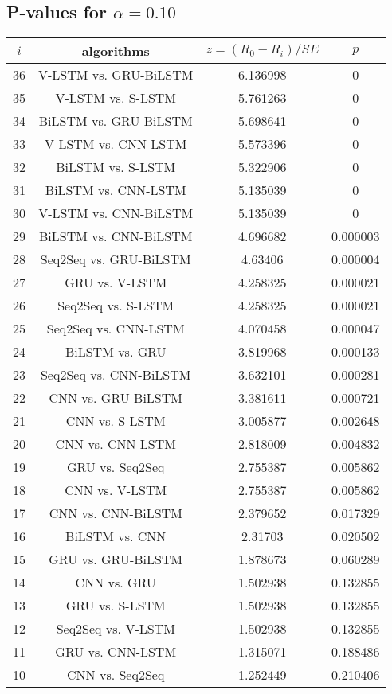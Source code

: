 \documentclass[a4paper,10pt]{article}
\begin{document}
\begin{landscape}
\subsection{P-values for $\alpha=0.10$}

\begin{table}[!htp]
\centering\scriptsize
\begin{tabular}{cccc}
$i$&algorithms&$z=(R_0 - R_i)/SE$&$p$\\
\hline36&V-LSTM vs. GRU-BiLSTM&6.136998&0\\
35&V-LSTM vs. S-LSTM&5.761263&0\\
34&BiLSTM vs. GRU-BiLSTM&5.698641&0\\
33&V-LSTM vs. CNN-LSTM&5.573396&0\\
32&BiLSTM vs. S-LSTM&5.322906&0\\
31&BiLSTM vs. CNN-LSTM&5.135039&0\\
30&V-LSTM vs. CNN-BiLSTM&5.135039&0\\
29&BiLSTM vs. CNN-BiLSTM&4.696682&0.000003\\
28&Seq2Seq vs. GRU-BiLSTM&4.63406&0.000004\\
27&GRU vs. V-LSTM&4.258325&0.000021\\
26&Seq2Seq vs. S-LSTM&4.258325&0.000021\\
25&Seq2Seq vs. CNN-LSTM&4.070458&0.000047\\
24&BiLSTM vs. GRU&3.819968&0.000133\\
23&Seq2Seq vs. CNN-BiLSTM&3.632101&0.000281\\
22&CNN vs. GRU-BiLSTM&3.381611&0.000721\\
21&CNN vs. S-LSTM&3.005877&0.002648\\
20&CNN vs. CNN-LSTM&2.818009&0.004832\\
19&GRU vs. Seq2Seq&2.755387&0.005862\\
18&CNN vs. V-LSTM&2.755387&0.005862\\
17&CNN vs. CNN-BiLSTM&2.379652&0.017329\\
16&BiLSTM vs. CNN&2.31703&0.020502\\
15&GRU vs. GRU-BiLSTM&1.878673&0.060289\\
14&CNN vs. GRU&1.502938&0.132855\\
13&GRU vs. S-LSTM&1.502938&0.132855\\
12&Seq2Seq vs. V-LSTM&1.502938&0.132855\\
11&GRU vs. CNN-LSTM&1.315071&0.188486\\
10&CNN vs. Seq2Seq&1.252449&0.210406\\

\end{tabular}
\end{table}
\end{landscape}
\end{document}
